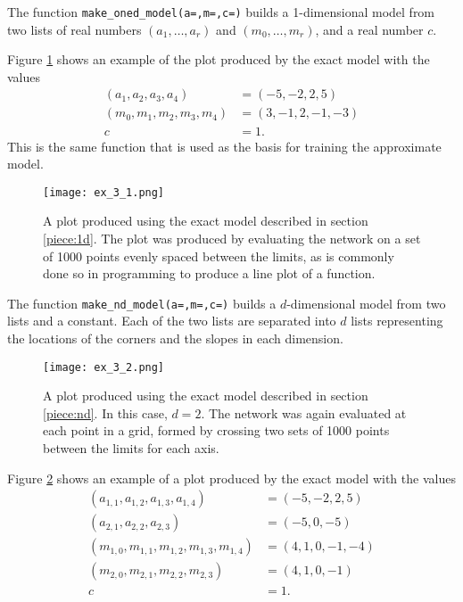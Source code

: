 \documentclass{somasmsc}
\begin{document}
\begin{exa}
The function \verb|make_oned_model(a=,m=,c=)| builds a 1-dimensional model from two lists of real numbers $\left(a_1, \dots, a_r\right)$ and $\left(m_0, \dots, m_r\right)$, and a real number $c$.



Figure \ref{piece:ex_3_1} shows an example of the plot produced by the exact model with the values
\begin{align*}
    \left(a_1, a_2, a_3, a_4\right) &= \left(-5, -2, 2, 5\right) \\
    \left(m_0, m_1, m_2, m_3, m_4\right) &= \left(3, -1, 2, -1, -3\right) \\
    c &= 1.
\end{align*}
This is the same function that is used as the basis for training the approximate model.

\begin{figure}[H]\label{piece:ex_3_1}
\begin{center}
\texttt{[image: ex\_3\_1.png]}
\end{center}
\caption{A plot produced using the exact model described in section \ref{piece:1d}. The plot was produced by evaluating the network on a set of 1000 points evenly spaced between the limits, as is commonly done so in programming to produce a line plot of a function.}
\end{figure}
\end{exa}

\begin{exa}
The function \verb|make_nd_model(a=,m=,c=)| builds a $d$-dimensional model from two lists and a constant. Each of the two lists are separated into $d$ lists representing the locations of the corners and the slopes in each dimension.

\begin{figure}[H]\label{piece:ex_3_2}
\begin{center}
\texttt{[image: ex\_3\_2.png]}
\end{center}
\caption{A plot produced using the exact model described in section \ref{piece:nd}. In this case, $d=2$. The network was again evaluated at each point in a grid, formed by crossing two sets of 1000 points between the limits for each axis.}
\end{figure}

Figure \ref{piece:ex_3_2} shows an example of a plot produced by the exact model with the values
\begin{align*}
    \left(a_{1,1}, a_{1,2}, a_{1,3}, a_{1,4}\right) &= \left(-5, -2, 2, 5\right) \\
    \left(a_{2,1}, a_{2,2}, a_{2,3}\right) &= \left(-5, 0, -5\right) \\
    \left(m_{1,0}, m_{1,1}, m_{1,2}, m_{1,3}, m_{1,4}\right) &= \left(4, 1, 0, -1, -4\right) \\
    \left(m_{2,0}, m_{2,1}, m_{2,2}, m_{2,3}\right) &= \left(4, 1, 0, -1\right) \\
    c &= 1.
\end{align*}
\end{exa}
\end{document}

